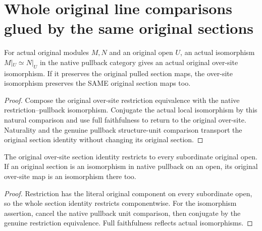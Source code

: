 \section{Whole original line comparisons glued by the same original sections}

\begin{definition}
\label{def:fc-section-preserving-over-comparison}
\leanok
{}
For actual original modules $M,N$ and an original open $U$, an
actual isomorphism $M|_U\simeq N|_U$ in the native pullback category
gives an actual original over-site isomorphism. If it preserves
the original pulled section maps, the over-site isomorphism
preserves the SAME original section maps too.
\end{definition}
\begin{proof}
Compose the original over-site restriction equivalence with the
native restriction--pullback isomorphism. Conjugate the actual
local isomorphism by this natural comparison and use full
faithfulness to return to the original over-site. Naturality and
the genuine pullback structure-unit comparison transport the
original section identity without changing its original section.
\end{proof}

\begin{theorem}
\label{thm:fc-section-preserving-restriction}
\leanok
{}
The original over-site section identity restricts to every
subordinate original open. If an original section is an
isomorphism in native pullback on an open, its original over-site
map is an isomorphism there too.
\end{theorem}
\begin{proof}
Restriction has the literal original component on every subordinate
open, so the whole section identity restricts componentwise.
For the isomorphism assertion, cancel the native pullback unit
comparison, then conjugate by the genuine restriction equivalence.
Full faithfulness reflects actual isomorphisms.
\end{proof}

